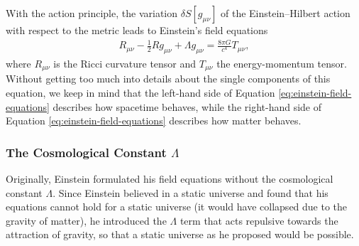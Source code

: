 \noindent With the action principle, the variation $\delta S[g_{\mu\nu}]$ of the Einstein--Hilbert action with respect to the metric leads to Einstein's field equations
\begin{align}
    R_{\mu\nu} - \frac{1}{2}R g_{\mu\nu} + \Lambda g_{\mu\nu} = \frac{8\pi G}{c^4}T_{\mu \nu}, \label{eq:einstein-field-equations}
\end{align}
where $R_{\mu\nu}$ is the Ricci curvature tensor and $T_{\mu\nu}$ the energy-momentum tensor. \\
\noindent Without getting too much into details about the single components of this equation, we keep in mind that the left-hand side of Equation \eqref{eq:einstein-field-equations} describes how spacetime behaves, while the right-hand side of Equation \eqref{eq:einstein-field-equations} describes how matter behaves.

\subsubsection{The Cosmological Constant $\Lambda$}

\noindent Originally, Einstein formulated his field equations without the cosmological constant $\Lambda$. Since Einstein believed in a static universe and found that his equations cannot hold for a static universe (it would have collapsed due to the gravity of matter), he introduced the $\Lambda$ term that acts repulsive towards the attraction of gravity, so that a static universe as he proposed would be possible. \\

